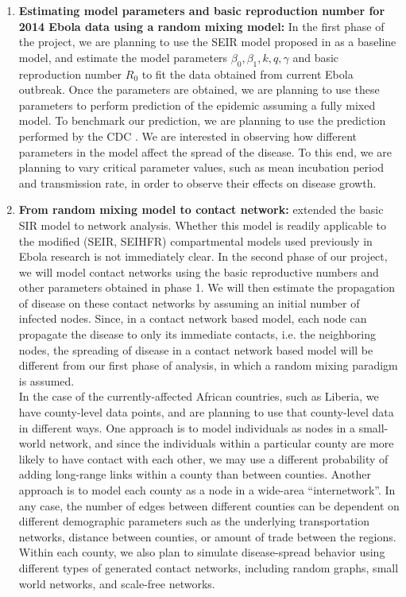 \documentclass[10pt, journal,onecolumn]{IEEEtran}
\begin{document}
\begin{enumerate}

\item \textbf{Estimating model parameters and basic reproduction number for 2014 Ebola data using a random mixing model:}
  In the first phase of the project, we are planning to use the SEIR model proposed in
  \citep{chowell2004basic} as a baseline model, and estimate the model parameters $\beta_0, \beta_1,
  k, q, \gamma$  and basic reproduction number $R_0$ to fit the data obtained from current Ebola
  outbreak. Once the parameters are obtained, we are planning to use these parameters to perform
  prediction of the epidemic assuming a fully mixed model. To benchmark our prediction, we are
  planning to use the prediction performed by the CDC \citep{meltzer2014estimating}. We are
  interested in observing how different parameters in the model affect the spread of the disease. To
  this end, we are planning to vary critical parameter values, such as mean incubation period and
  transmission rate, in order to observe their effects on disease growth.

\item \textbf{From random mixing model to contact network:} \citep{newman2002spread,
  meyers2005network} extended the basic SIR model to network analysis. Whether this model is readily
  applicable to the modified (SEIR, SEIHFR) compartmental models used previously in Ebola research
  \citep{chowell2004basic, legrand2007understanding} is not immediately clear. In the second phase of
  our project, we will model contact networks using the basic reproductive numbers and other
  parameters obtained in phase 1. We will then estimate the propagation of disease on these
  contact networks by assuming an initial number of infected nodes. Since, in a contact network based
  model, each node can propagate the disease to only its immediate contacts, i.e. the neighboring
  nodes, the spreading of disease in a contact network based model will be different from our first
  phase of analysis, in which a random mixing paradigm is assumed. \\

  In the case of the currently-affected African countries, such as Liberia,
  we have county-level data points, and are planning to use that county-level data in different ways.
  One approach is to model individuals as nodes in a small-world network, and
  since the individuals within a particular county are more likely to have contact with each other,
  we may use a different probability of adding long-range links within a county than between counties.
  Another approach is to model each county as a node in a wide-area ``internetwork''.
  In any case, the number of edges between different counties can be dependent on different
  demographic parameters such as the underlying transportation networks, distance between counties,
  or amount of trade between the regions.
  Within each county, we also plan to simulate disease-spread behavior using different types of
  generated contact networks, including random graphs, small world networks, and scale-free
  networks. \\


\end{enumerate}
\end{document}
